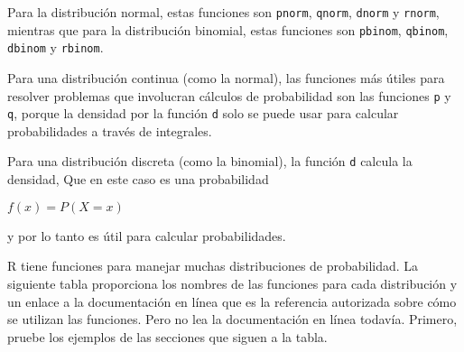 \documentclass[
]{book}
\begin{document}
Para la distribución normal, estas funciones son \texttt{pnorm}, \texttt{qnorm}, \texttt{dnorm} y \texttt{rnorm}, mientras que para la distribución binomial, estas funciones son \texttt{pbinom}, \texttt{qbinom}, \texttt{dbinom} y \texttt{rbinom}.

Para una distribución continua (como la normal), las funciones más útiles para resolver problemas que involucran cálculos de probabilidad son las funciones \texttt{p} y \texttt{q}, porque la densidad por la función \texttt{d} solo se puede usar para calcular probabilidades a través de integrales.

Para una distribución discreta (como la binomial), la función \texttt{d} calcula la densidad, Que en este caso es una probabilidad

\(f(x) = P(X = x)\)

y por lo tanto es útil para calcular probabilidades.

R tiene funciones para manejar muchas distribuciones de probabilidad. La siguiente tabla proporciona los nombres de las funciones para cada distribución y un enlace a la documentación en línea que es la referencia autorizada sobre cómo se utilizan las funciones. Pero no lea la documentación en línea todavía. Primero, pruebe los ejemplos de las secciones que siguen a la tabla.
\end{document}
